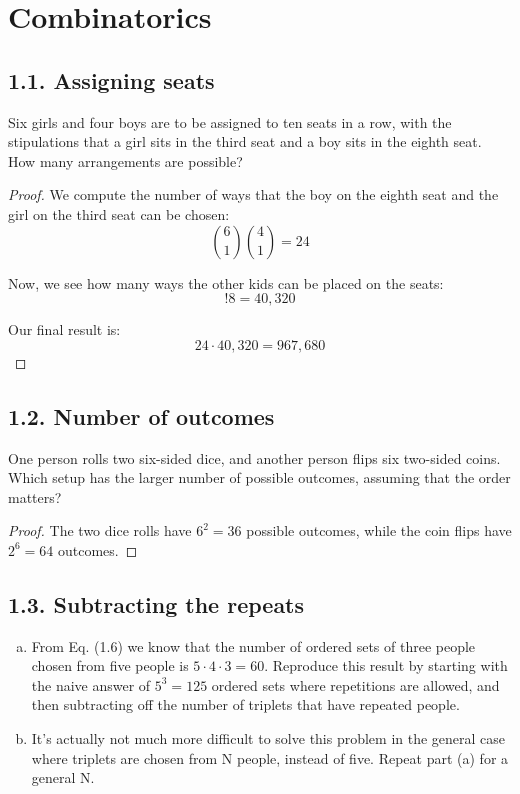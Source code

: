 \chapter{Combinatorics}

\section*{1.1. Assigning seats}
Six girls and four boys are to be assigned to ten seats in a row, with the stipulations
that a girl sits in the third seat and a boy sits in the eighth seat. How many arrangements
are possible?

\vspace{1em}

\begin{proof}
    We compute the number of ways that the boy on the eighth seat and the girl on the third seat can be chosen:
    \[
        \binom{6}{1}\binom{4}{1} = 24
    \]

    Now, we see how many ways the other kids can be placed on the seats:
    \[
        !8 = 40,320
    \]

    Our final result is:
    \[
        24 \cdot 40,320 = 967,680
\]
\end{proof}

\section*{1.2. Number of outcomes}
One person rolls two six-sided dice, and another person flips six two-sided coins.
Which setup has the larger number of possible outcomes, assuming that the order matters?

\vspace{1em}

\begin{proof}
    The two dice rolls have $6^2 = 36$ possible outcomes, while the coin flips have $2^6 = 64$ outcomes.
\end{proof}

\section*{1.3. Subtracting the repeats}
\begin{enumerate}[(a)]
    \item From Eq. (1.6) we know that the number of ordered sets of three people chosen from five people
        is $5 \cdot 4 \cdot 3 = 60$. Reproduce this result by starting with the naive answer of $5^3 = 125$
        ordered sets where repetitions are allowed, and then subtracting off the number of triplets that have
        repeated people.
    \item It's actually not much more difficult to solve this problem in the general case where triplets
        are chosen from N people, instead of five. Repeat part (a) for a general N.
\end{enumerate}

